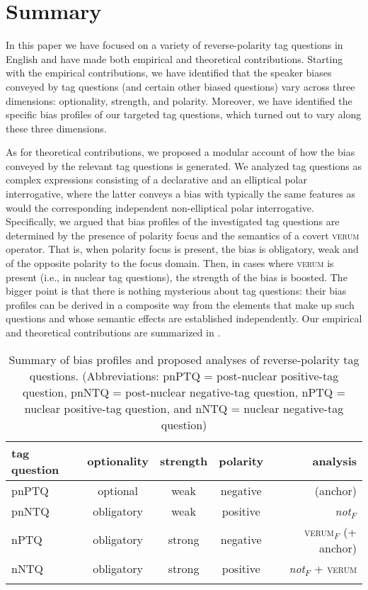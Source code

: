 \documentclass[output=paper,colorlinks,citecolor=brown]{langscibook}
\begin{document}
\section{Summary}\label{Sect6}
In this paper we have focused on a variety of reverse-polarity tag questions in English and have made both empirical and theoretical contributions. Starting with the empirical contributions, we have identified that the speaker biases conveyed by tag questions (and certain other biased questions) vary across three dimensions: optionality, strength, and polarity. Moreover, we have identified the specific bias profiles of our targeted tag questions, which turned out to vary along these three dimensions. 

As for theoretical contributions, we proposed a modular account of how the bias conveyed by the relevant tag questions is generated. We analyzed tag questions as complex expressions consisting of a declarative and an elliptical polar interrogative, where the latter conveys a bias with typically the same features as would the corresponding independent non-elliptical polar interrogative. Specifically, we argued that bias profiles of the investigated tag questions are determined by the presence of polarity focus and the semantics of a covert \textsc{verum} operator. That is, when polarity focus is present, the bias is obligatory, weak and of the opposite polarity to the focus domain. Then, in cases where \textsc{verum} is present (i.e., in nuclear tag questions), the strength of the bias is boosted. The bigger point is that there is nothing mysterious about tag questions: their bias profiles can be derived in a composite way from the elements that make up such questions and whose semantic effects are established independently. Our empirical and theoretical contributions are summarized in . 

\begin{table}
 \begin{tabular}{l cccr}
  \lsptoprule
  tag question  & optionality & strength  & polarity & analysis\\
  \midrule
  pnPTQ &   optional    &   weak    &   negative    & (anchor) \\
  pnNTQ &   obligatory  &   weak    &   positive    & \textit{not}$_F$ \\
  nPTQ  &   obligatory  &   strong  &   negative    & \textsc{verum}$_F$ (+ anchor)\\
  nNTQ  &   obligatory  &   strong    &   positive    & \textit{not}$_F$ + \textsc{verum}\\
  \lspbottomrule
 \end{tabular}
\caption{Summary of bias profiles and proposed analyses of reverse-polarity tag questions. (Abbreviations: pnPTQ = post-nuclear positive-tag question, pnNTQ = post-nuclear negative-tag question, nPTQ = nuclear positive-tag question, and nNTQ = nuclear negative-tag question)}
\label{tab.2.summary}
\end{table}
\end{document}
